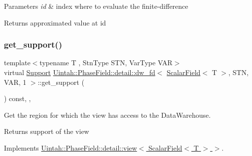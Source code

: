 \begin{DoxyParams}{Parameters}
{\em id} & index where to evaluate the finite-\/difference \\
\hline
\end{DoxyParams}
\begin{DoxyReturn}{Returns}
approximated value at id 
\end{DoxyReturn}
\mbox{\label{classUintah_1_1PhaseField_1_1detail_1_1dw__fd_3_01ScalarField_3_01T_01_4_00_01STN_00_01VAR_00_011_01_4_a7171f44368a08fb35192a7c9e05b25d8}} 
\subsubsection{\texorpdfstring{get\+\_\+support()}{get\_support()}}
{\footnotesize\ttfamily template$<$typename T , Stn\+Type S\+TN, Var\+Type V\+AR$>$ \\
virtual \hyperlink{classUintah_1_1PhaseField_1_1Support}{Support} \hyperlink{classUintah_1_1PhaseField_1_1detail_1_1dw__fd}{Uintah\+::\+Phase\+Field\+::detail\+::dw\+\_\+fd}$<$ \hyperlink{structUintah_1_1PhaseField_1_1ScalarField}{Scalar\+Field}$<$ T $>$, S\+TN, V\+AR, 1 $>$\+::get\+\_\+support (\begin{DoxyParamCaption}{ }\end{DoxyParamCaption}) const\hspace{0.3cm}{\ttfamily [inline]}, {\ttfamily [override]}, {\ttfamily [virtual]}}



Get the region for which the view has access to the Data\+Warehouse. 

\begin{DoxyReturn}{Returns}
support of the view 
\end{DoxyReturn}


Implements \hyperlink{classUintah_1_1PhaseField_1_1detail_1_1view_3_01ScalarField_3_01T_01_4_01_4_a3e14b0c7a57a57707bb33954861ab1c1}{Uintah\+::\+Phase\+Field\+::detail\+::view$<$ Scalar\+Field$<$ T $>$ $>$}.

